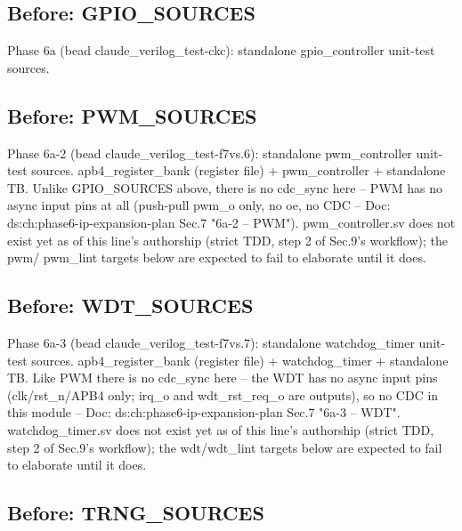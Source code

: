 \begin{record}
\subsection*{Before: GPIO\_SOURCES}

\begin{textblock}
Phase 6a (bead claude_verilog_test-ckc): standalone gpio_controller unit-test sources.
\end{textblock}

\subsection*{Before: PWM\_SOURCES}

\begin{textblock}
Phase 6a-2 (bead claude_verilog_test-f7vs.6): standalone pwm_controller unit-test sources.
apb4_register_bank (register file) + pwm_controller + standalone TB. Unlike GPIO_SOURCES above,
there is no cdc_sync here -- PWM has no async input pins at all (push-pull pwm_o only, no
oe, no CDC -- Doc: ds:ch:phase6-ip-expansion-plan Sec.7 "6a-2 -- PWM"). pwm_controller.sv does not
exist yet as of this line's authorship (strict TDD, step 2 of Sec.9's workflow); the pwm/
pwm_lint targets below are expected to fail to elaborate until it does.
\end{textblock}

\subsection*{Before: WDT\_SOURCES}

\begin{textblock}
Phase 6a-3 (bead claude_verilog_test-f7vs.7): standalone watchdog_timer unit-test sources.
apb4_register_bank (register file) + watchdog_timer + standalone TB. Like PWM there is no
cdc_sync here -- the WDT has no async input pins (clk/rst_n/APB4 only; irq_o and
wdt_rst_req_o are outputs), so no CDC in this module -- Doc: ds:ch:phase6-ip-expansion-plan Sec.7
"6a-3 -- WDT". watchdog_timer.sv does not exist yet as of this line's authorship (strict TDD,
step 2 of Sec.9's workflow); the wdt/wdt_lint targets below are expected to fail to elaborate
until it does.
\end{textblock}

\subsection*{Before: TRNG\_SOURCES}


\end{record}

